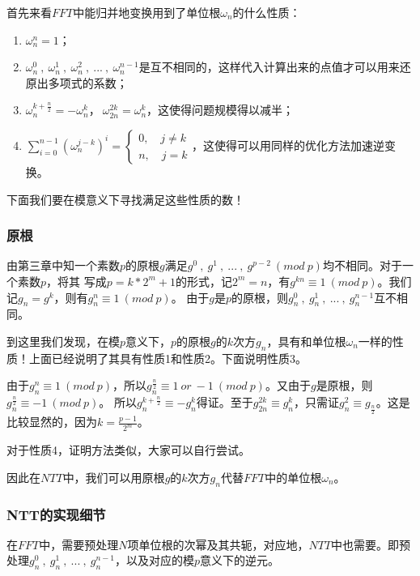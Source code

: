首先来看$FFT$中能归并地变换用到了单位根$\omega_n$的什么性质：
\begin{enumerate}
\item $\omega_n^n = 1$；
\item $\omega_n^0\ ,\ \omega_n^1\ ,\ \omega_n^2\ ,\ ...\ ,\ \omega_n^{n-1}$是互不相同的，这样代入计算出来的点值才可以用来还原出多项式的系数；
\item $\omega_n^{k+\frac{n}{2}}=-\omega_n^{k}$，$\ \omega_{2n}^{2k}=\omega_n^k$，这使得问题规模得以减半；
\item $\sum_{i=0}^{n-1}(\omega_n^{j-k})^i = \left\{\begin{matrix}
0,\quad j\neq k\\ 
n,\quad j= k
\end{matrix}\right.$，这使得可以用同样的优化方法加速逆变换。
\end{enumerate}

下面我们要在模意义下寻找满足这些性质的数！

\subsubsection{原根}
由第三章中知一个素数$p$的原根$g$满足$g^0\ ,\ g^1\ ,\ ...\ ,\ g^{p-2}\ (mod\ p)$均不相同。对于一个素数$p$，将其
写成$p=k*2^m + 1$的形式，记$2^m=n$，有$g^{kn}\equiv 1\ (mod\ p)$。我们记$g_n = g^k$，则有$g_n^n\equiv 1\ (mod\ p)$。
由于$g$是$p$的原根，则$g_n^0\ ,\ g_n^1\ ,\ ...\ ,\ g_n^{n-1}$互不相同。

到这里我们发现，在模$p$意义下，$p$的原根$g$的$k$次方$g_n$，具有和单位根$\omega_n$一样的性质！上面已经说明了其具有性质1和性质2。下面说明性质3。

由于$g_n^n\equiv 1\ (mod\ p)$，所以$g_n^{\frac{n}{2}}\equiv 1\ or\ -1\ (mod\ p)$。又由于$g$是原根，则$g_n^{\frac{n}{2}}\equiv -1\ (mod\ p)$。
所以$g_n^{k+\frac{n}{2}}\equiv -g_n^{k}$得证。至于$g_{2n}^{2k}\equiv g_n^k$，只需证$g_n^2\equiv g_{\frac{n}{2}}$。这是比较显然的，因为$k=\frac{p-1}{2^m}$。

对于性质4，证明方法类似，大家可以自行尝试。

因此在$NTT$中，我们可以用原根$g$的$k$次方$g_n$代替$FFT$中的单位根$\omega_{n}$。

\subsubsection{NTT的实现细节}
在$FFT$中，需要预处理$N$项单位根的次幂及其共轭，对应地，$NTT$中也需要。即预处理$g_n^0\ ,\ g_n^1\ ,\ ...\ ,\ g_n^{n-1}$，以及对应的模$p$意义下的逆元。

